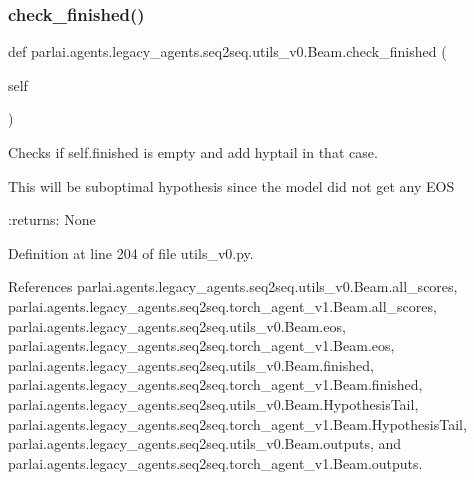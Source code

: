 \subsubsection{\texorpdfstring{check\+\_\+finished()}{check\_finished()}}
{\footnotesize\ttfamily def parlai.\+agents.\+legacy\+\_\+agents.\+seq2seq.\+utils\+\_\+v0.\+Beam.\+check\+\_\+finished (\begin{DoxyParamCaption}\item[{}]{self }\end{DoxyParamCaption})}

\begin{DoxyVerb}Checks if self.finished is empty and add hyptail in that case.

This will be suboptimal hypothesis since the model did not get any EOS

:returns: None
\end{DoxyVerb}
 

Definition at line 204 of file utils\+\_\+v0.\+py.



References parlai.\+agents.\+legacy\+\_\+agents.\+seq2seq.\+utils\+\_\+v0.\+Beam.\+all\+\_\+scores, parlai.\+agents.\+legacy\+\_\+agents.\+seq2seq.\+torch\+\_\+agent\+\_\+v1.\+Beam.\+all\+\_\+scores, parlai.\+agents.\+legacy\+\_\+agents.\+seq2seq.\+utils\+\_\+v0.\+Beam.\+eos, parlai.\+agents.\+legacy\+\_\+agents.\+seq2seq.\+torch\+\_\+agent\+\_\+v1.\+Beam.\+eos, parlai.\+agents.\+legacy\+\_\+agents.\+seq2seq.\+utils\+\_\+v0.\+Beam.\+finished, parlai.\+agents.\+legacy\+\_\+agents.\+seq2seq.\+torch\+\_\+agent\+\_\+v1.\+Beam.\+finished, parlai.\+agents.\+legacy\+\_\+agents.\+seq2seq.\+utils\+\_\+v0.\+Beam.\+Hypothesis\+Tail, parlai.\+agents.\+legacy\+\_\+agents.\+seq2seq.\+torch\+\_\+agent\+\_\+v1.\+Beam.\+Hypothesis\+Tail, parlai.\+agents.\+legacy\+\_\+agents.\+seq2seq.\+utils\+\_\+v0.\+Beam.\+outputs, and parlai.\+agents.\+legacy\+\_\+agents.\+seq2seq.\+torch\+\_\+agent\+\_\+v1.\+Beam.\+outputs.

\mbox{\label{classparlai_1_1agents_1_1legacy__agents_1_1seq2seq_1_1utils__v0_1_1Beam_ac37b26314438d9e94b03e5a45efaf5dd}} 
